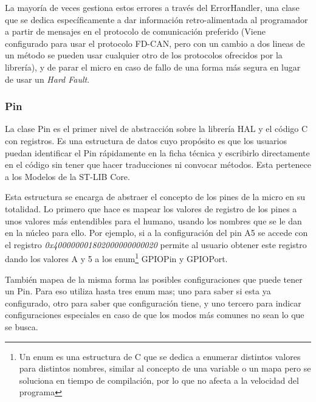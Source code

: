 \documentclass{report}
\begin{document}
La mayoría de veces gestiona estos errores a través del ErrorHandler, una clase que se dedica específicamente a dar información retro-alimentada al programador a partir de mensajes en el protocolo de comunicación preferido (Viene configurado para usar el protocolo FD-CAN, pero con un cambio a dos lineas de un método se pueden usar cualquier otro de los protocolos ofrecidos por la librería), y de parar el micro en caso de fallo de una forma más segura en lugar de usar un \textit{Hard Fault}. 

\subsubsection{Pin}
La clase Pin es el primer nivel de abstracción sobre la librería HAL y el código C con registros. Es una estructura de datos cuyo propósito es que los usuarios puedan identificar el Pin rápidamente en la ficha técnica y escribirlo directamente en el código sin tener que hacer traducciones ni convocar métodos. Esta pertenece a los Modelos de la ST-LIB Core.
\par \vspace{0.3 cm}
Esta estructura se encarga de abstraer el concepto de los pines de la micro en su totalidad. Lo primero que hace es mapear los valores de registro de los pines a unos valores más entendibles para el humano, usando los nombres que se le dan en la núcleo para ello. Por ejemplo, si a la configuración del pin A5 se accede con el registro \textit{0x400000001802000000000020} permite al usuario obtener este registro dando los valores A y 5 a los enum\footnote{Un enum es una estructura de C que se dedica a enumerar distintos valores para distintos nombres, similar al concepto de una variable o un mapa pero se soluciona en tiempo de compilación, por lo que no afecta a la velocidad del programa}   GPIOPin y GPIOPort. 
\par \vspace{0.3 cm}
También mapea de la misma forma las posibles configuraciones que puede tener un Pin. Para eso utiliza hasta tres enum mas; uno para saber si esta ya configurado, otro para saber que configuración tiene, y uno tercero para indicar configuraciones especiales en caso de que los modos más comunes no sean lo que se busca. 
\par \vspace{0.3 cm}
\end{document}
